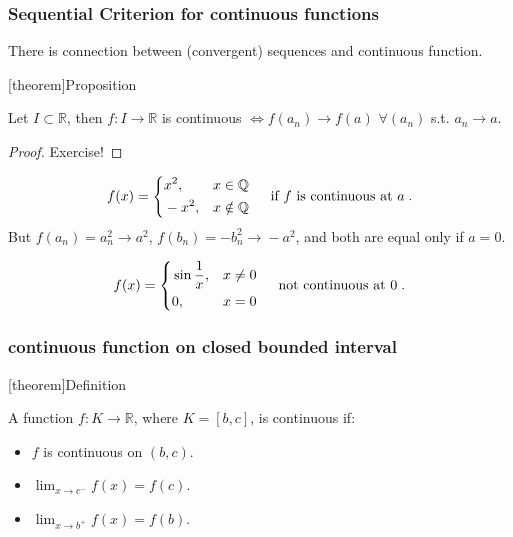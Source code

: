 \documentclass[12pt]{report}
\theoremstyle{definition}
\begin{document}
\subsubsection{Sequential Criterion for continuous functions}

There is connection between (convergent) sequences and continuous function.

[theorem]{Proposition}
\begin{continuous function and sequences}
    Let $I\subset \mathbb{R}$, then $f:I\rightarrow{}\mathbb{R}$ is continuous
    $\iff f(a_n) \rightarrow{} f(a)$ $\forall (a_n)$ s.t. $a_n \rightarrow{}a$.
\end{continuous function and sequences}

\begin{proof}
    Exercise!
\end{proof}

\begin{ex}
    \[
        f(x) = \left\{
            \begin{align*}
                & x^{2}, & x\in \mathbb{Q} \\
                & -x^{2}, & x\notin \mathbb{Q}
            \end{align*}
            \right. \quad\;\textnormal{if $f$ is continuous at $a$}\;.
    \]
    But $f(a_n) = a^{2}_n \rightarrow{}a^{2}$,
    $f(b_n) = -b^{2}_n \rightarrow{} -a^{2}$,
    and both are equal only if $a = 0$.
\end{ex}

\begin{ex}
    \[
        f(x) = \left\{
            \begin{align*}
                & \sin{\frac{1}{x}}, & x \neq 0 \\
                & 0, & x = 0
            \end{align*}
            \right.\quad\;\textnormal{not continuous at 0}\;.
    \]
\end{ex}

\subsubsection{continuous function on closed bounded interval}

[theorem]{Definition}
\begin{continuous for closed function}
    A function $f:K\rightarrow{}\mathbb{R}$, where $K = [b,c]$, is continuous if:
    \begin{itemize}
        \item $f$ is continuous on $(b,c)$.
        \item $\lim_{x\rightarrow{}c^{-}}f(x) = f(c)$.
        \item $\lim_{x\rightarrow{}b^{+}}f(x) = f(b)$.
    \end{itemize}
\end{continuous for closed function}
\end{document}
